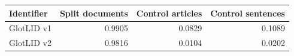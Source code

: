 \begin{tabular}{lrrr}
\toprule
Identifier & Split documents & Control articles & Control sentences \\
\midrule
GlotLID v1 & 0.9905 & 0.0829 & 0.1089 \\
GlotLID v2 & 0.9816 & 0.0104 & 0.0202 \\
\bottomrule
\end{tabular}
